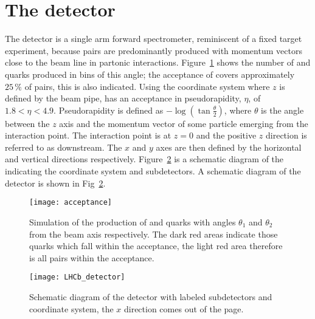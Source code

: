 \section{The \lhcb detector}

The \lhcb detector is a single arm forward spectrometer, reminiscent of a fixed target experiment,
because \bbbar pairs are predominantly produced with momentum vectors close to the beam line in
partonic interactions.
Figure~\ref{fig:lhcb:bbbar} shows the number of \bquark and \bquarkbar quarks produced in bins of
this angle; the acceptance of \lhcb covers approximately $25\,\%$ of \bbbar pairs, this is also indicated.
Using the coordinate system where $z$ is defined by the \lhc beam pipe,
\lhcb has an acceptance in pseudorapidity, $\eta$, of $1.8<\eta<4.9$.  %
Pseudorapidity is defined as $-\log\left(\tan\tfrac\theta2\right)$, where $\theta$ is the angle
between the $z$ axis and the momentum vector of some particle emerging from the interaction point.
The interaction point is at $z=0$ and the positive $z$ direction is referred to as downstream.
The $x$ and $y$ axes are then defined by the horizontal and vertical directions respectively.
Figure~\ref{fig:lhcb:lhcb} is a schematic diagram of the \lhcb indicating the coordinate system and
subdetectors.
A schematic diagram of the \lhcb detector is shown in Fig~\ref{fig:lhcb:lhcb}.

\begin{figure}
  \begin{center}
    \texttt{[image: acceptance]}
  \end{center}
  \caption[Simulated production of \protect\bbbar pairs]
  {\small
    Simulation of the production of \bquark and \protect\bquarkbar quarks with angles $\theta_1$ and
    $\theta_2$ from the beam axis respectively.
    The dark red areas indicate those quarks which fall within the \lhcb acceptance, the light red
    area therefore is all \bbbar pairs within the acceptance.
  }
  \label{fig:lhcb:bbbar}
\end{figure}

\begin{figure}
  \begin{center}
    \texttt{[image: LHCb\_detector]}
  \end{center}
  \caption[\lhcb detector]
  {\small
    Schematic diagram of the \lhcb detector with labeled subdetectors and coordinate system, the
    $x$ direction comes out of the page.
  }
  \label{fig:lhcb:lhcb}
\end{figure}


